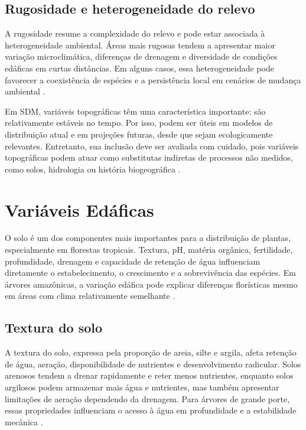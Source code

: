 \subsection{Rugosidade e heterogeneidade do relevo}

A rugosidade resume a complexidade do relevo e pode estar associada à heterogeneidade ambiental. Áreas mais rugosas tendem a apresentar maior variação microclimática, diferenças de drenagem e diversidade de condições edáficas em curtas distâncias. Em alguns casos, essa heterogeneidade pode favorecer a coexistência de espécies e a persistência local em cenários de mudança ambiental \parencite{franklin2010mapping,guisan2017habitat}.

Em SDM, variáveis topográficas têm uma característica importante: são relativamente estáveis no tempo. Por isso, podem ser úteis em modelos de distribuição atual e em projeções futuras, desde que sejam ecologicamente relevantes. Entretanto, sua inclusão deve ser avaliada com cuidado, pois variáveis topográficas podem atuar como substitutas indiretas de processos não medidos, como solos, hidrologia ou história biogeográfica \parencite{zurell2020standard}.

\section{Variáveis Edáficas}

O solo é um dos componentes mais importantes para a distribuição de plantas, especialmente em florestas tropicais. Textura, pH, matéria orgânica, fertilidade, profundidade, drenagem e capacidade de retenção de água influenciam diretamente o estabelecimento, o crescimento e a sobrevivência das espécies. Em árvores amazônicas, a variação edáfica pode explicar diferenças florísticas mesmo em áreas com clima relativamente semelhante \parencite{tuomisto2019diversity,guisan2017habitat}.

\subsection{Textura do solo}

A textura do solo, expressa pela proporção de areia, silte e argila, afeta retenção de água, aeração, disponibilidade de nutrientes e desenvolvimento radicular. Solos arenosos tendem a drenar rapidamente e reter menos nutrientes, enquanto solos argilosos podem armazenar mais água e nutrientes, mas também apresentar limitações de aeração dependendo da drenagem. Para árvores de grande porte, essas propriedades influenciam o acesso à água em profundidade e a estabilidade mecânica \parencite{tuomisto2019diversity,poggio2021soilgrids}.

